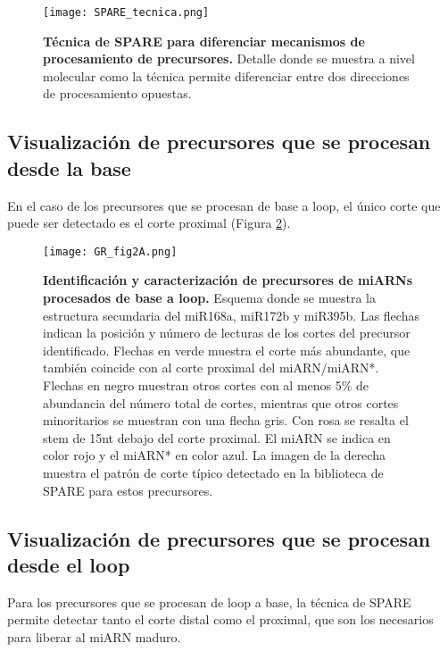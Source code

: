 \begin{figure}[htbp!] 
	\centering    
	\texttt{[image: SPARE\_tecnica.png]}
	\caption[Técnica de SPARE]{
        \textbf{Técnica de SPARE para diferenciar mecanismos de procesamiento de precursores.}
        Detalle donde se muestra a nivel molecular como la técnica permite diferenciar entre dos direcciones de procesamiento opuestas. 
    }
	 \label{fig:SPARE_tecnica}
\end{figure}

\subsection{Visualización de precursores que se procesan desde la base}

En el caso de los precursores que se procesan de base a loop, el único corte que puede ser detectado es el corte proximal (Figura \ref{fig:GR_fig2A}).

\begin{figure}[htbp!] 
    \centering    
    \texttt{[image: GR\_fig2A.png]}
    \caption[Identificación y caracterización de precursores de miARNs procesados de base a loop]{
    \textbf{Identificación y caracterización de precursores de miARNs procesados de base a loop.}
            Esquema donde se muestra la estructura secundaria del miR168a, miR172b y miR395b.
            Las flechas indican la posición y número de lecturas de los cortes del precursor identificado.
            Flechas en verde muestra el corte más abundante, que también coincide con al corte proximal del miARN/miARN*.
            Flechas en negro muestran otros cortes con al menos 5\% de abundancia del número total de cortes, mientras que otros cortes minoritarios se muestran con una flecha gris.
            Con rosa se resalta el stem de 15nt debajo del corte proximal.
            El miARN se indica en color rojo y el miARN* en color azul.
            La imagen de la derecha muestra el patrón de corte típico detectado en la biblioteca de SPARE para estos precursores.}
    \label{fig:GR_fig2A}
\end{figure}

\subsection{Visualización de precursores que se procesan desde el loop}

Para los precursores que se procesan de loop a base, la técnica de SPARE permite detectar tanto el corte distal como el proximal, que son los necesarios para liberar al miARN maduro.


